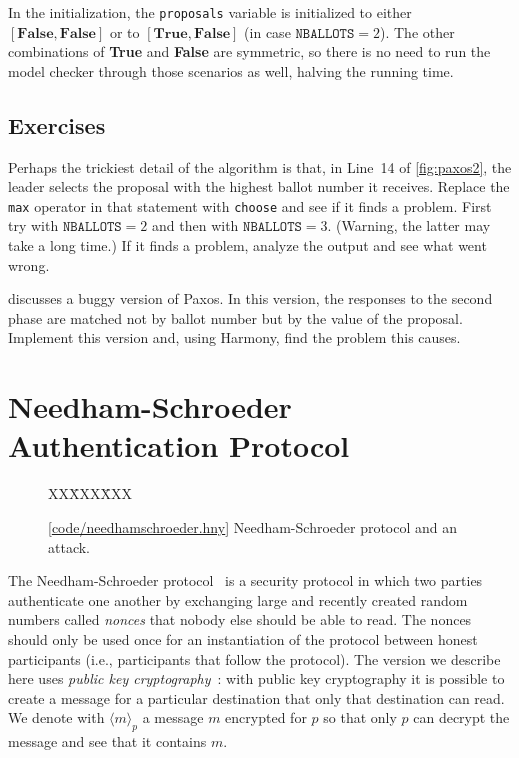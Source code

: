 \documentclass{report}
\newcommand{\harmonysource}[1]{
\begin{tabbing}
XX\=XXX\=XXX\kill
    
\end{tabbing}
}
\newcommand{\harmonylink}[1]{%
[\href{https://harmony.cs.cornell.edu/#1}{\underline{#1}}]%
}
\newenvironment{code}{
\tcolorbox
}{
\endtcolorbox
}
\begin{document}
In the initialization, the \texttt{proposals} variable is initialized
to either $[\mathbf{False}, \mathbf{False}]$ or
to $[\mathbf{True}, \mathbf{False}]$ (in case $\texttt{NBALLOTS} = 2$).
The other combinations of \textbf{True} and \textbf{False} are symmetric,
so there is no need to run the model checker through those scenarios as
well, halving the running time.

\section*{Exercises}
\begin{problems}
\item Perhaps the trickiest detail of the algorithm is that, in Line~14
of \autoref{fig:paxos2}, the leader selects the proposal with the highest
ballot number it receives.  Replace the \texttt{max} operator in that statement
with \texttt{choose} and see if it finds a problem.  First try with
$\texttt{NBALLOTS} = 2$ and then with $\texttt{NBALLOTS} = 3$.
(Warning, the latter may take a long time.)  If it finds a problem,
analyze the output and see what went wrong.
\item \cite{MWA19} discusses a buggy version of Paxos.  In this version,
the responses to the second phase are matched not by ballot number but
by the value of the proposal.  Implement this version and, using Harmony,
find the problem this causes.
\end{problems}

\chapter{Needham-Schroeder Authentication Protocol}
\label{ch:ns}

\begin{figure}
\begin{code}
\harmonysource{needhamschroeder}
\end{code}
\caption{\harmonylink{code/needhamschroeder.hny} Needham-Schroeder protocol and an attack.}
\label{fig:ns}
\end{figure}

The Needham-Schroeder protocol~\cite{NS78} is a security protocol in which two parties
authenticate one another by exchanging large and recently created random numbers
called \emph{nonces} that nobody else should be able to read.
The nonces should only be used once for an instantiation of the protocol between
honest participants (i.e., participants that follow the protocol).
The version we describe here uses \emph{public key cryptography}~\cite{DH76}: with public key
cryptography it is possible to create a message for a particular destination that
only that destination can read.  We denote with $\langle m \rangle_p$ a message
$m$ encrypted for $p$ so that only $p$ can decrypt the message and see that it contains $m$.
\end{document}
